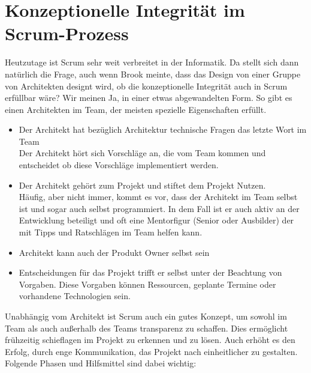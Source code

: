 \documentclass[a4paper, ngerman, 12pt, usenames, dvipsnames]{article}
\begin{document}
\section{Konzeptionelle Integrität im Scrum-Prozess}
Heutzutage ist Scrum sehr weit verbreitet in der Informatik. Da stellt sich dann natürlich die Frage, auch wenn Brook meinte, dass das Design von einer Gruppe von Architekten designt wird,
ob die konzeptionelle Integrität auch in Scrum erfüllbar wäre? Wir meinen Ja, in einer etwas abgewandelten Form. So gibt es einen Architekten im Team, der meisten spezielle Eigenschaften erfüllt.
\begin{itemize}
    \item Der Architekt hat bezüglich Architektur technische Fragen das letzte Wort im Team \\
    Der Architekt hört sich Vorschläge an, die vom Team kommen und entscheidet ob diese Vorschläge implementiert werden.
    \item Der Architekt gehört zum Projekt und stiftet dem Projekt Nutzen.\\
    Häufig, aber nicht immer, kommt es vor, dass der Architekt im Team selbst ist und sogar auch selbst programmiert.
    In dem Fall ist er auch aktiv an der Entwicklung beteiligt und oft eine Mentorfigur (Senior oder Ausbilder) der mit Tipps und Ratschlägen im Team helfen kann.
    \item Architekt kann auch der Produkt Owner selbst sein
    \item Entscheidungen für das Projekt trifft er selbst unter der Beachtung von Vorgaben.
    Diese Vorgaben können Ressourcen, geplante Termine oder vorhandene Technologien sein.
\end{itemize}
Unabhängig vom Architekt ist Scrum auch ein gutes Konzept, um sowohl im Team als auch außerhalb des Teams transparenz zu schaffen. 
Dies ermöglicht frühzeitig schieflagen im Projekt zu erkennen und zu lösen. Auch erhöht es den Erfolg, durch enge Kommunikation, das Projekt nach einheitlicher zu gestalten.
Folgende Phasen und Hilfsmittel sind dabei wichtig:
\end{document}
